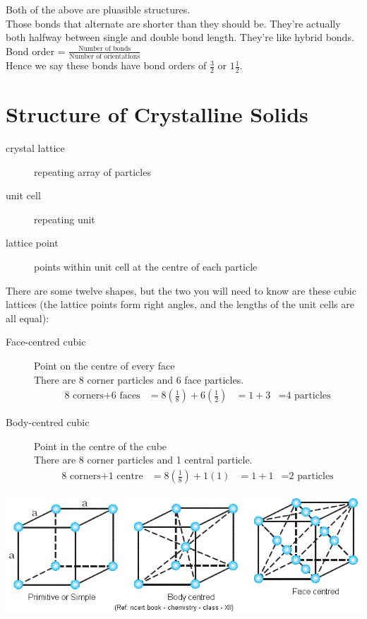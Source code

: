 \documentclass[a4paper, 8pt]{memoir}
\begin{document}
Both of the above are pluasible structures. \\

Those bonds that alternate are shorter than they should be. They're actually both halfway between single and double bond length. They're like hybrid bonds. \\

Bond order = $\frac{\text{Number of bonds}}{\text{Number of orientations}}$ \\

Hence we say these bonds have bond orders of $\frac{3}{2}$ or $1\frac{1}{2}$. \\

\chapter{Structure of Crystalline Solids}
\begin{description}
\item[crystal lattice] repeating array of particles
\item[unit cell] repeating unit
\item[lattice point] points within unit cell at the centre of each particle
\end{description}

There are some twelve shapes, but the two you will need to know are these cubic lattices (the lattice points form right angles, and the lengths of the unit cells are all equal):
\begin{description}
\item[Face-centred cubic] Point on the centre of every face \\
There are 8 corner particles and 6 face particles. \\
\begin{align*}
\text{8 corners} + \text{6 faces} &= 8(\frac{1}{8}) + 6(\frac{1}{2})
&= 1 + 3
&= \text{4 particles}
\end{align*}
\item[Body-centred cubic] Point in the centre of the cube \\
There are 8 corner particles and 1 central particle. \\
\begin{align*}
\text{8 corners} + \text{1 centre} &= 8(\frac{1}{8}) + 1(1)
&= 1 + 1
&= \text{2 particles}
\end{align*}
\end{description}

\includegraphics[scale=0.4]{Cubic_Lattice_ThreeTypes} \\
\end{document}
